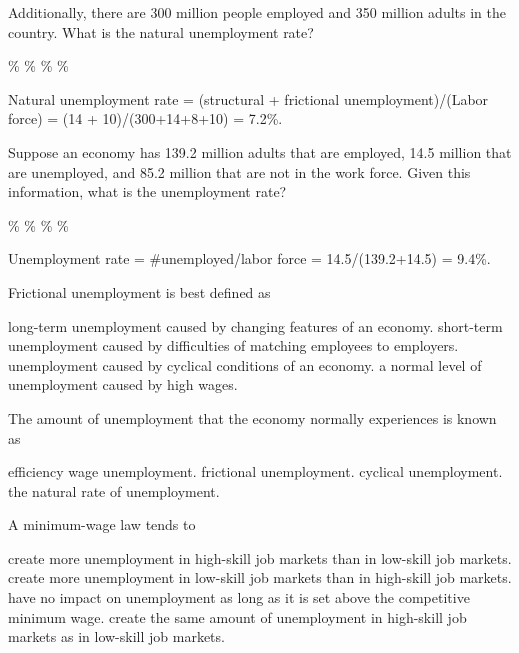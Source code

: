\documentclass[addpoints,11pt]{exam}
\theoremstyle{definition}
\begin{document}
\begin{questions}
	
	
	Additionally, there are 300 million people employed and 350 million adults in the country. What is the natural unemployment rate?
	
	\begin{choices}
		\%
		\%
		\%
		\%
	\end{choices}
	
	\begin{solution}
		Natural unemployment rate = (structural + frictional unemployment)/(Labor force) = (14 + 10)/(300+14+8+10) = 7.2\%.
	\end{solution}
	
	\question Suppose an economy has 139.2 million adults that are employed, 14.5 million that are unemployed, and 85.2 million that are not in the work force. Given this information, what is the unemployment rate?
	
	\begin{choices}
		\choice 6.1\%
		\CorrectChoice 9.4\%
		\choice 10.4\%
		\choice 8.7\%
	\end{choices}
	
	\begin{solution}
		Unemployment rate = \#unemployed/labor force = 14.5/(139.2+14.5) = 9.4\%.
	\end{solution}

	
	\question Frictional unemployment is best defined as 
	
	\begin{choices}
		\choice long-term unemployment caused by changing features of an economy.
		\CorrectChoice short-term unemployment caused by difficulties of matching employees to employers.
		\choice unemployment caused by cyclical conditions of an economy.
		\choice a normal level of unemployment caused by high wages. 
	\end{choices}
	
\question The amount of unemployment that the economy normally experiences is known as

\begin{choices}
	\choice efficiency wage unemployment.
	\choice frictional unemployment.
	\choice cyclical unemployment.
	\CorrectChoice the natural rate of unemployment.
\end{choices}

\question A minimum-wage law tends to 

\begin{choices}
	\choice create more unemployment in high-skill job markets than in low-skill job markets.
	\CorrectChoice create more unemployment in low-skill job markets than in high-skill job markets.
	\choice have no impact on unemployment as long as it is set above the competitive minimum wage.
	\choice create the same amount of unemployment in high-skill job markets as in low-skill job markets.
\end{choices}


\end{questions}
\end{document}
